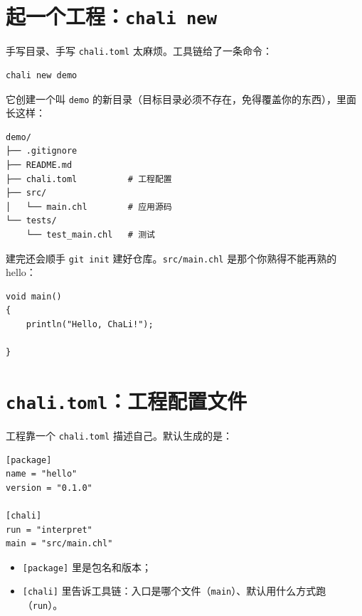 \section{起一个工程：\texttt{chali new}}

手写目录、手写 \texttt{chali.\allowbreak{}toml} 太麻烦。工具链给了一条命令：

\par
\medskip
\begin{lstlisting}[style=sh]
chali new demo
\end{lstlisting}
\par
\medskip

它创建一个叫 \texttt{demo} 的新目录（目标目录必须不存在，免得覆盖你的东西），里面长这样：

\par
\medskip
\begin{lstlisting}[style=out]
demo/
├── .gitignore
├── README.md
├── chali.toml          # 工程配置
├── src/
│   └── main.chl        # 应用源码
└── tests/
    └── test_main.chl   # 测试
\end{lstlisting}
\par
\medskip

建完还会顺手 \texttt{git init} 建好仓库。\texttt{src/\allowbreak{}main.\allowbreak{}chl} 是那个你熟得不能再熟的 hello：

\par
\medskip
\begin{lstlisting}[style=chali]
void main()
{
    println("Hello, ChaLi!");

}
\end{lstlisting}
\par
\medskip

\section{\texttt{chali.\allowbreak{}toml}：工程配置文件}

工程靠一个 \texttt{chali.\allowbreak{}toml} 描述自己。默认生成的是：

\par
\medskip
\begin{lstlisting}[style=cfg]
[package]
name = "hello"
version = "0.1.0"

[chali]
run = "interpret"
main = "src/main.chl"
\end{lstlisting}
\par
\medskip

\begin{itemize}

\item \texttt{[\allowbreak{}package]\allowbreak{}} 里是包名和版本；

\item \texttt{[\allowbreak{}chali]\allowbreak{}} 里告诉工具链：入口是哪个文件（\texttt{main}）、默认用什么方式跑（\texttt{run}）。

\end{itemize}

